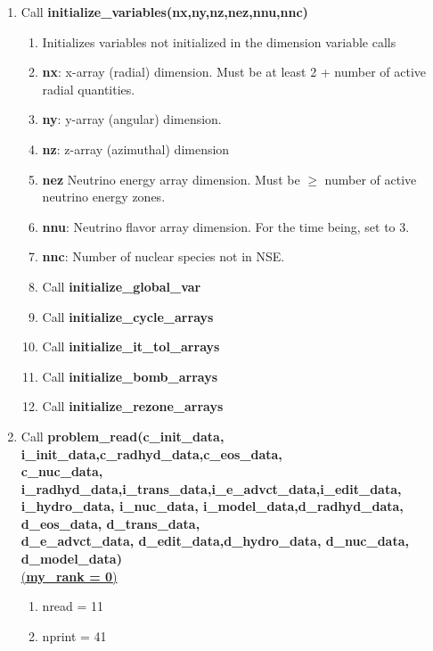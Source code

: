 \documentclass[11pt,doublespace]{article}
\begin{document}
\begin{itemize}
\begin{enumerate}
\begin{enumerate}
  \item Call {\bf initialize\_variables(nx,ny,nz,nez,nnu,nnc)}
\begin{enumerate}
  \item Initializes variables not initialized in the dimension variable calls
  \item {\bf nx}: x-array (radial) dimension. Must be at least 2 + number of active radial quantities.
  \item {\bf ny}: y-array (angular) dimension.
  \item {\bf nz}: z-array (azimuthal) dimension
  \item  {\bf nez} Neutrino energy array dimension. Must be $\ge$ number of active neutrino energy zones.
  \item  {\bf nnu}: Neutrino flavor array dimension. For the time being, set to 3.
  \item  {\bf nnc}: Number of nuclear species not in NSE.
  \item Call {\bf initialize\_global\_var}
  \item Call {\bf initialize\_cycle\_arrays}
  \item Call {\bf initialize\_it\_tol\_arrays}
  \item Call {\bf initialize\_bomb\_arrays}
  \item Call {\bf initialize\_rezone\_arrays}
\end{enumerate}

  \item Call {\bf problem\_read(c\_init\_data, i\_init\_data,c\_radhyd\_data,c\_eos\_data,\\
c\_nuc\_data, i\_radhyd\_data,i\_trans\_data,i\_e\_advct\_data,i\_edit\_data, \\
i\_hydro\_data, i\_nuc\_data, i\_model\_data,d\_radhyd\_data, d\_eos\_data, d\_trans\_data,\\
d\_e\_advct\_data, d\_edit\_data,d\_hydro\_data, d\_nuc\_data, d\_model\_data)}\\
 \underline{({\bf my\_rank = 0})}
\begin{enumerate}
  \item nread = 11
  \item nprint = 41


\end{enumerate}
\end{enumerate}
\end{enumerate}
\end{itemize}
\end{document}
